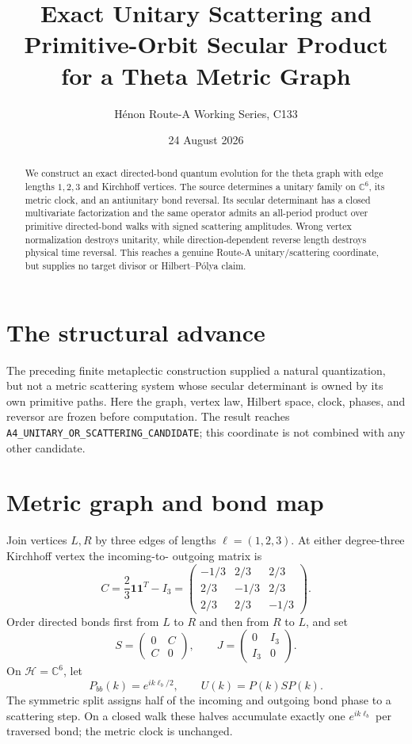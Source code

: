 \documentclass[11pt]{article}
\title{Exact Unitary Scattering and Primitive-Orbit Secular Product\\
for a Theta Metric Graph}
\author{H\'enon Route-A Working Series, C133}
\date{24 August 2026}
\begin{document}
\maketitle
\begin{abstract}
We construct an exact directed-bond quantum evolution for the theta graph with
edge lengths $1,2,3$ and Kirchhoff vertices.  The source determines a unitary
family on $\mathbb C^6$, its metric clock, and an antiunitary bond reversal.
Its secular determinant has a closed multivariate factorization and the same
operator admits an all-period product over primitive directed-bond walks with
signed scattering amplitudes.  Wrong vertex normalization destroys unitarity,
while direction-dependent reverse length destroys physical time reversal.
This reaches a genuine Route-A unitary/scattering coordinate, but supplies no
target divisor or Hilbert--P\'olya claim.
\end{abstract}

\section{The structural advance}

The preceding finite metaplectic construction supplied a natural
quantization, but not a metric scattering system whose secular determinant is
owned by its own primitive paths.  Here the graph, vertex law, Hilbert space,
clock, phases, and reversor are frozen before computation.  The result reaches
\texttt{A4\_UNITARY\_OR\_SCATTERING\_CANDIDATE}; this coordinate is not
combined with any other candidate.

\section{Metric graph and bond map}

Join vertices $L,R$ by three edges of lengths
$\ell=(1,2,3)$.  At either degree-three Kirchhoff vertex the incoming-to-
outgoing matrix is
\[
 C=\frac23\mathbf 1\mathbf 1^{T}-I_3
 =\begin{pmatrix}-1/3&2/3&2/3\\2/3&-1/3&2/3\\2/3&2/3&-1/3\end{pmatrix}.
\]
Order directed bonds first from $L$ to $R$ and then from $R$ to $L$, and set
\[
 S=\begin{pmatrix}0&C\\C&0\end{pmatrix},\qquad
 J=\begin{pmatrix}0&I_3\\I_3&0\end{pmatrix}.
\]
On $\mathcal H=\mathbb C^6$, let
\[
 P_{bb}(k)=e^{ik\ell_b/2},\qquad U(k)=P(k)S P(k).
\]
The symmetric split assigns half of the incoming and outgoing bond phase to a
scattering step.  On a closed walk these halves accumulate exactly one
$e^{ik\ell_b}$ per traversed bond; the metric clock is unchanged.
\end{document}

